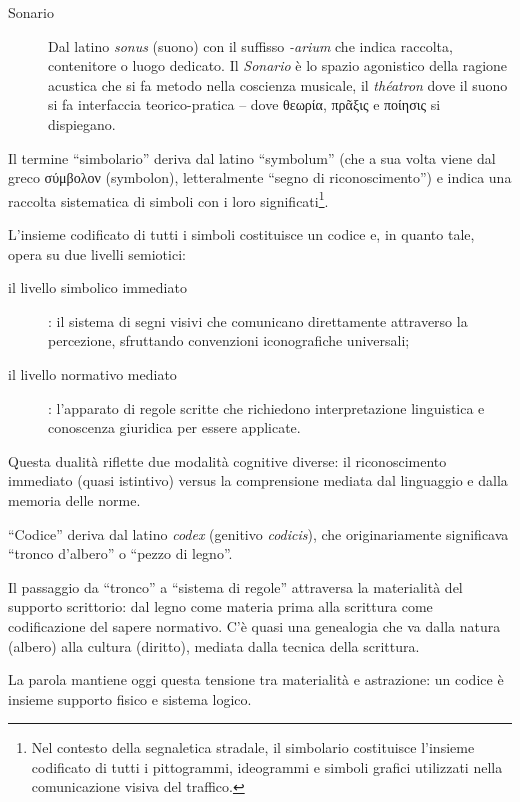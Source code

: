 \begin{description}
  \item[Sonario] Dal latino \emph{sonus} (suono) con il suffisso \emph{-arium}
  che indica raccolta, contenitore o luogo dedicato. Il \emph{Sonario} è lo
  spazio agonistico della ragione acustica che si fa metodo nella coscienza
  musicale, il \emph{théatron} dove il suono si fa interfaccia teorico-pratica –
  dove \textgreek{θεωρία}, \textgreek{πρᾶξις} e \textgreek{ποίησις} si dispiegano.
\end{description}

Il termine “simbolario” deriva dal latino “symbolum” (che a sua volta viene dal
greco \textgreek{σύμβολον} (symbolon), letteralmente “segno di riconoscimento”)
e indica una raccolta sistematica di simboli con i loro significati\footnote{Nel
contesto della segnaletica stradale, il simbolario costituisce l'insieme
codificato di tutti i pittogrammi, ideogrammi e simboli grafici utilizzati nella
comunicazione visiva del traffico.}.

L'insieme codificato di tutti i simboli costituisce un codice e, in quanto tale,
opera su due livelli semiotici:
\begin{description}
  \item[il livello simbolico immediato]: il sistema di segni visivi che
  comunicano direttamente attraverso la percezione, sfruttando convenzioni
  iconografiche universali;
  \item[il livello normativo mediato]: l'apparato di regole scritte che
  richiedono interpretazione linguistica e conoscenza giuridica per essere
  applicate.
\end{description}

Questa dualità riflette due modalità cognitive diverse: il riconoscimento
immediato (quasi istintivo) versus la comprensione mediata dal linguaggio e
dalla memoria delle norme.

“Codice” deriva dal latino \emph{codex} (genitivo \emph{codicis}), che
originariamente significava “tronco d'albero” o “pezzo di legno”.

Il passaggio da “tronco” a “sistema di regole” attraversa la materialità del
supporto scrittorio: dal legno come materia prima alla scrittura come
codificazione del sapere normativo. C'è quasi una genealogia che va dalla natura
(albero) alla cultura (diritto), mediata dalla tecnica della scrittura.

La parola mantiene oggi questa tensione tra materialità e astrazione: un codice
è insieme supporto fisico e sistema logico.

